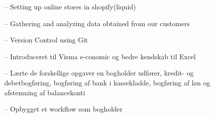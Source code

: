 \documentclass[10pt,a4paper]{altacv}
\begin{document}
\tagline{}

%

\begin{fullwidth}
\makecvheader
\end{fullwidth}

%





 
\begin{itemize}
    \setlength{\itemindent}{0.1ex}
    \item[--]   \small{Setting up online stores in shopify(liquid) }
    \item[--]   \small{Gathering and analyzing data obtained from our customers }
    \item[--]   \small{Version Control using Git}
\end{itemize}

\begin{itemize}
    \setlength{\itemindent}{0.1ex}
    \item[--]   \small{Introduceret til Visma e-conomic og bedre kendskab til Excel}

    \item[--]   \small{Lærte de forskellige opgaver en bogholder udfører, kredit- og debetbogføring, bogføring af bank i kassekladde, bogføring af løn og afstemning af balancekonti}

    \item[--]   \small{Opbygget et workflow som bogholder}

\end{itemize}
\end{document}

